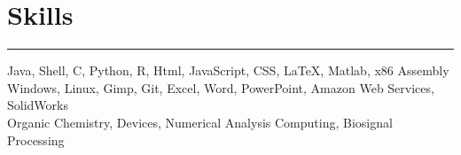 \documentclass[letterpaper]{deedy-resume} %
\newcommand{\colorrule}[1]{%
\begingroup\color{#1}\hrule\endgroup%
}%
\begin{document}
\section{Skills}
\normalfont
\colorrule{black}
\vspace{2 mm}
Java, Shell, C, Python, R, Html, JavaScript, CSS, LaTeX, Matlab, x86 Assembly\\
Windows, Linux, Gimp, Git, Excel, Word, PowerPoint, Amazon Web Services, SolidWorks\\ 
Organic Chemistry, Devices, Numerical Analysis Computing, Biosignal Processing\\

\sectionspace %

\end{document}
